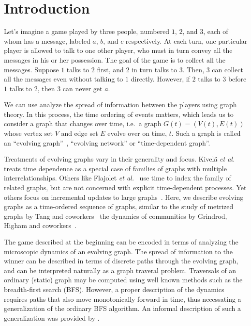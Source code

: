 \documentclass[11pt,conference,compsocconf]{IEEEtran}
\theoremstyle{definition}
\begin{document}
\section{Introduction}

Let's imagine a game played by three people, numbered $1$, $2$, and $3$,
each of whom has a message, labeled $a$, $b$, and $c$ respectively.
At each turn, one particular player is allowed to talk to one other player,
who must in turn convey all the messages in his or her possession.
The goal of the game is to collect all the messages.
Suppose $1$ talks to $2$ first, and $2$ in turn talks to $3$.
Then, $3$ can collect all the messages even without talking to $1$ directly.
However, if $2$ talks to $3$ before $1$ talks to $2$, then
$3$ can never get $a$.

We can use analyze the spread of information between the players using graph
theory. In this process, the time ordering of events matters, which leads us to
consider a graph that changes over time, i.e.\ a graph $G(t) = (V(t), E(t))$ whose
vertex set $V$ and edge set $E$ evolve over on time, $t$.
Such a graph is called an ``evolving graph''~\cite{fkp89,bkmu12},
``evolving network'' or %
``time-dependent graph''. %

Treatments of evolving graphs vary in their generality and focus.
Kivel\"a \textit{et al.}~\cite{kabg14} treats time dependence as a special
case of families of graphs with multiple interrelationships.
Others like Flajolet \textit{et al.}~\cite{fkp89} use time to index the family
of related graphs, but are not concerned with explicit time-dependent processes.
Yet others focus on incremental updates to large graphs~\cite{bkmu12}.
Here, we describe evolving graphs as a time-ordered sequence of graphs, similar
to the study of metrized graphs by Tang and coworkers~\cite{ntmm13,tmml09,tsmm09,tmml10}
the dynamics of communities by Grindrod, Higham and coworkers~\cite{gphe11,grihig13}.

The game described at the beginning can be encoded in terms of analyzing the
microscopic dynamics of an evolving graph. The spread of information to the
winner can be described in terms of discrete paths through the evolving graph,
and can be interpreted naturally as a graph traveral problem. Traversals of an
ordinary (static) graph may be computed using well known methods such as the
breadth-first search (BFS). However, a proper description of the dynamics
requires paths that also move monotonically forward in time, thus necessating
a generalization of the ordinary BFS algorithm. An informal description of such
a generalization was provided by \cite{tmml09}.
\end{document}
